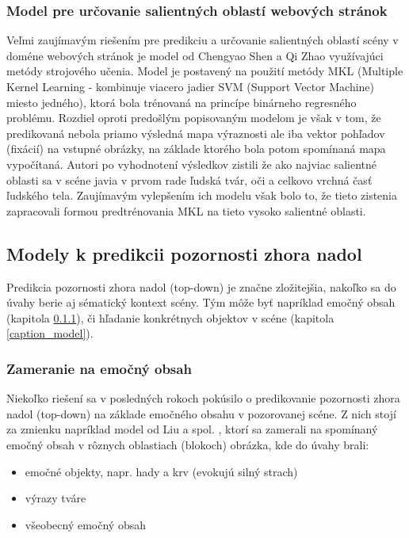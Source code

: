 \subsubsection{Model pre určovanie salientných oblastí webových stránok}

Veľmi zaujímavým riešením pre predikciu a určovanie salientných oblastí scény v doméne webových stránok je model od Chengyao Shen a Qi Zhao\cite{Saliency} využívajúci metódy strojového učenia. Model je postavený na použití metódy MKL (Multiple Kernel Learning - kombinuje viacero jadier SVM (Support Vector Machine) miesto jedného), ktorá bola 
trénovaná na princípe binárneho regresného problému. Rozdiel oproti predošlým popisovaným modelom je však v tom, že predikovaná nebola priamo výsledná mapa výraznosti ale iba vektor pohľadov (fixácií) na vstupné obrázky, na základe ktorého bola potom spomínaná mapa vypočítaná. Autori po vyhodnotení výsledkov zistili že ako najviac salientné oblasti sa v scéne javia v prvom rade ľudská tvár, oči a celkovo vrchná časť ľudského tela. Zaujímavým vylepšením ich modelu však bolo to, že tieto zistenia zapracovali formou predtrénovania MKL na tieto vysoko salientné oblasti. 


\subsection{Modely k predikcii pozornosti zhora nadol}

\label{top-down_modely}
Predikcia pozornosti zhora nadol (top-down) je značne zložitejšia, nakoľko sa do úvahy berie aj sématický kontext scény. Tým môže byť napríklad emočný obsah (kapitola \ref{emotion_content}), či hľadanie konkrétnych objektov v scéne (kapitola \ref{caption_model}).


\subsubsection{Zameranie na emočný obsah}
\label{emotion_content}
Niekoľko riešení sa v posledných rokoch pokúsilo o predikovanie pozornosti zhora nadol (top-down) na základe emočného obsahu v pozorovanej scéne. Z nich stojí za zmienku napríklad model od Liu a spol. \cite{liu2016improving}, ktorí sa zamerali na spomínaný emočný obsah v rôznych oblastiach (blokoch) obrázka, kde do úvahy brali:
\begin{itemize}
	\item emočné objekty, napr. hady a krv (evokujú silný strach)
	\item výrazy tváre
	\item všeobecný emočný obsah
\end{itemize}

